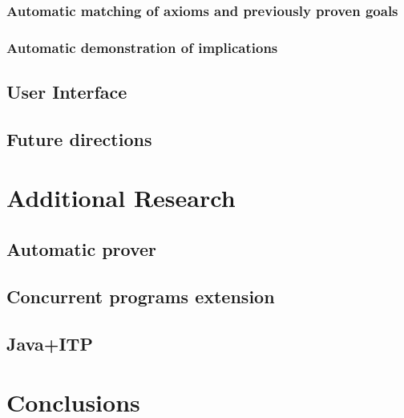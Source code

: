 \documentclass[12pt,a4paper]{article}
\begin{document}
\subsubsection{Automatic matching of axioms and previously proven goals}
\subsubsection{Automatic demonstration of implications}
\subsection{User Interface}
\subsection{Future directions}
\section{Additional Research}
\subsection{Automatic prover}
\subsection{Concurrent programs extension}
\subsection{Java+ITP}

\section{Conclusions}
\pagebreak


\end{document}
